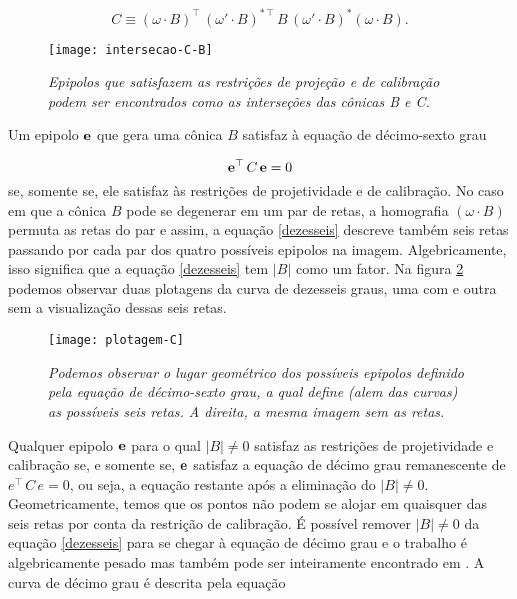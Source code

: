 \begin{equation}
C \equiv (\omega \cdot B)^\top\,(\omega' \cdot B)^{*\,\top}\,B\,(\omega' \cdot B)^*(\omega \cdot B).
\end{equation}

\begin{figure}[!htb]
\centering
\texttt{[image: intersecao-C-B]}
\caption{\textit{Epipolos que satisfazem as restrições de projeção e de calibração podem ser encontrados como as interseções das cônicas B e C.}}
\label{inter-B-C}
\end{figure}

Um epipolo ${\bf e}$ que gera uma cônica $B$ satisfaz à equação de décimo-sexto grau

\begin{equation}
{\bf e}^\top\,C\,{\bf e} = 0
\label{dezesseis}
\end{equation}
se, somente se, ele satisfaz às restrições de projetividade e de calibração. No caso em que a cônica $B$ pode se degenerar em um par de retas, a homografia $(\omega \cdot B)$ permuta as retas do par e assim, a equação \ref{dezesseis} descreve também seis retas passando por cada par dos quatro possíveis epipolos na imagem. Algebricamente, isso significa que a equação \ref{dezesseis} tem $|B|$ como um fator. Na figura \ref{plot-C} podemos observar duas plotagens da curva de dezesseis graus, uma com e outra sem a visualização dessas seis retas.

\begin{figure}[!htb]
\centering
\texttt{[image: plotagem-C]}
\caption{\textit{Podemos observar o lugar geométrico dos possíveis epipolos definido pela equação de décimo-sexto grau, a qual define (alem das curvas) as possíveis seis retas. A direita, a mesma imagem sem as retas.}}
\label{plot-C}
\end{figure}

Qualquer epipolo ${\bf e}$ para o qual $|B|\ne0$ satisfaz as restrições de projetividade e calibração se, e somente se, ${\bf e}$ satisfaz a equação de décimo grau remanescente de $e^\top\,C\,e=0$, ou seja, a equação restante após a eliminação do $|B|\ne0$. Geometricamente, temos que os pontos não podem se alojar em quaisquer das seis retas por conta da restrição de calibração. É possível remover $|B|\ne0$ da equação \ref{dezesseis} para se chegar à equação de décimo grau e o trabalho é algebricamente pesado mas também pode ser inteiramente encontrado em \cite{kneebone}. A curva de décimo grau é descrita pela equação

